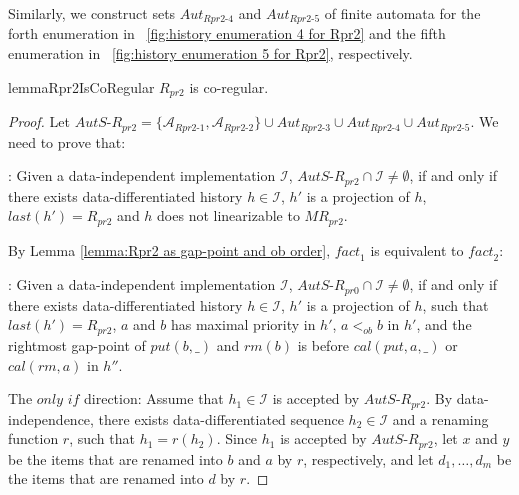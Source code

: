 \documentclass{llncs}
\begin{document}
Similarly, we construct sets $\textit{Aut}_{\textit{Rpr2-4}}$ and $\textit{Aut}_{\textit{Rpr2-5}}$ of finite automata for the forth enumeration in \figurename~\ref{fig:history enumeration 4 for Rpr2} and the fifth enumeration in \figurename~\ref{fig:history enumeration 5 for Rpr2}, respectively.


\begin{restatable}{lemma}{Rpr2IsCoRegular}
\label{lemma:Rpr2 is co-regular}
$R_{\textit{pr2}}$ is co-regular.
\end{restatable}

\begin {proof}

Let $\textit{AutS-R}_{\textit{pr2}} = \{ \mathcal{A}_{\textit{Rpr2-1}}, \mathcal{A}_{\textit{Rpr2-2}} \} \cup \textit{Aut}_{\textit{Rpr2-3}} \cup \textit{Aut}_{\textit{Rpr2-4}} \cup \textit{Aut}_{\textit{Rpr2-5}}$. We need to prove that:

: Given a data-independent implementation $\mathcal{I}$, $\textit{AutS-R}_{\textit{pr2}} \cap \mathcal{I} \neq \emptyset$, if and only if there exists data-differentiated history $h \in \mathcal{I}$, $h'$ is a projection of $h$, $\textit{last}(h') = R_{\textit{pr2}}$ and $h$ does not linearizable to $\textit{MR}_{\textit{pr2}}$.

By Lemma \ref{lemma:Rpr2 as gap-point and ob order}, $\textit{fact}_1$ is equivalent to $\textit{fact}_2$:

: Given a data-independent implementation $\mathcal{I}$, $\textit{AutS-R}_{\textit{pr0}} \cap \mathcal{I} \neq \emptyset$, if and only if there exists data-differentiated history $h \in \mathcal{I}$, $h'$ is a projection of $h$, such that $\textit{last}(h') = R_{\textit{pr2}}$, $a$ and $b$ has maximal priority in $h'$, $a <_{\textit{ob}} b$ in $h'$, and the rightmost gap-point of $\textit{put}(b,\_)$ and $\textit{rm}(b)$ is before $\textit{cal}(\textit{put},a,\_)$ or $\textit{cal}(\textit{rm},a)$ in $h''$.

\noindent The $\textit{only if}$ direction: Assume that $h_1 \in \mathcal{I}$ is accepted by $\textit{AutS-R}_{\textit{pr2}}$. By data-independence, there exists data-differentiated sequence $h_2 \in \mathcal{I}$ and a renaming function $r$, such that $h_1=r(h_2)$. Since $h_1$ is accepted by $\textit{AutS-R}_{\textit{pr2}}$, let $x$ and $y$ be the items that are renamed into $b$ and $a$ by $r$, respectively, and let $d_1,\ldots,d_m$ be the items that are renamed into $d$ by $r$.


\end{proof}
\end{document}
